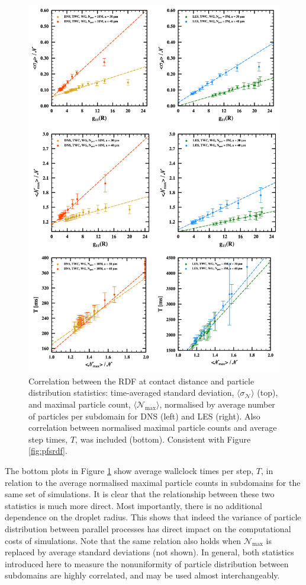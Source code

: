 \documentclass{pracamgren}
\begin{document}
\begin{figure}[!htbp]
\centering
\includegraphics[width=13.5cm]{img/plots/3-4a-pfprdf.pdf}
\caption{
Correlation between the RDF at contact distance and particle distribution statistics: time-averaged standard deviation, $\langle \sigma_{\mathcal{N}} \rangle$ (top), and maximal particle count, $\langle \mathcal{N}_{\max} \rangle$, normalised by average number of particles per subdomain for DNS (left) and LES (right).
Also correlation between normalised maximal particle counts and average step times, $T$, was included (bottom).
Consistent with Figure \ref{fig:pfsrdf}.
}
\label{fig:pfprdf}
\end{figure}

The bottom plots in Figure \ref{fig:pfprdf} show average wallclock times per step, $T$, in relation to the average normalised maximal particle counts in subdomains for the same set of simulations.
It is clear that the relationship between these two statistics is much more direct.
Most importantly, there is no additional dependence on the droplet radius.
This shows that indeed the variance of particle distribution between parallel processes has direct impact on the computational costs of simulations.
Note that the same relation also holds when $\mathcal{N}_{\max}$ is replaced by average standard deviations (not shown).
In general, both statistics introduced here to measure the nonuniformity of particle distribution between subdomains are highly correlated, and may be used almost interchangeably.
\end{document}
